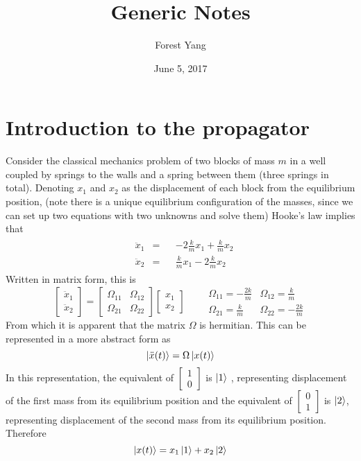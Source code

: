 \documentclass{article}
\title{Generic Notes}
\author{Forest Yang}
\date{June 5, 2017}
\begin{document}
\maketitle
\section{Introduction to the propagator} 
Consider the classical mechanics problem of two blocks of mass $m$ in a well coupled by springs to the walls and a spring between them (three springs in total). Denoting $x_1$ and $x_2$ as the displacement of each block from the equilibrium position, (note there is a unique equilibrium configuration of the masses, since we can set up two equations with two unknowns and solve them) Hooke's law implies that
\begin{align*}
\begin{aligned}
& \ddot{x}_1 & = && -2\frac{k}{m}x_1 + \frac{k}{m}x_2 \\
& \ddot{x}_2 & = && \frac{k}{m}x_1 - 2\frac{k}{m}x_2  
\end{aligned}
\end{align*}
Written in matrix form, this is 
\[
\begin{bmatrix} \ddot{x}_1 \\ \ddot{x}_2 \end{bmatrix} = \begin{bmatrix} \Omega_{11} & \Omega_{12} \\ \Omega_{21} & \Omega_{22} \end{bmatrix} 
\begin{bmatrix} x_1 \\ x_2 \end{bmatrix} \qquad \begin{array}{ll} \Omega_{11} = -\frac{2k}{m} & \Omega_{12} = \frac{k}{m} \\ \Omega_{21} = \frac{k}{m} & \Omega_{22} = -\frac{2k}{m} \end{array}
\]
From which it is apparent that the matrix $\Omega$ is hermitian. This can be represented in a more abstract form as \begin{equation*} \ket{\ddot{x}(t)} = \Omega\ket{x(t)} \end{equation*}
In this representation, the equivalent of $\begin{bmatrix} 1 \\ 0 \end{bmatrix}$ is $\ket{1}$ , representing displacement of the first mass from its equilibrium position and the equivalent of $\begin{bmatrix} 0 \\ 1 \end{bmatrix}$ is $\ket{2}$, representing displacement of the second mass from its equilibrium position. Therefore \begin{equation*} \ket{x(t)} = x_1\ket{1} + x_2 \ket{2} \end{equation*}
\end{document}

